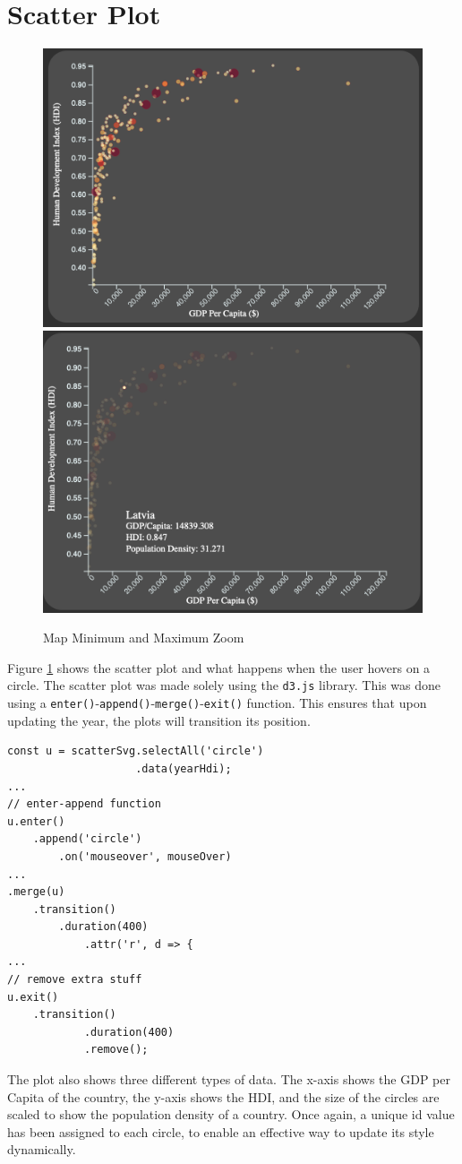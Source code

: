 \documentclass{scrreprt}
\begin{document}
\section{Scatter Plot}
\begin{figure}[H]
    \centering
    \includegraphics[height = 0.35\textwidth]{images/scatter_1.png}
    \includegraphics[height = 0.35\textwidth]{images/scatter_2.png}
    \label{fig:scatter}
    \caption{Map Minimum and Maximum Zoom}
\end{figure}
Figure \ref{fig:scatter} shows the scatter plot and what happens when the user hovers on a circle. The scatter plot was made solely using the \verb|d3.js| library. This was done using a \verb|enter()|-\verb|append()|-\verb|merge()|-\verb|exit()| function. This ensures that upon updating the year, the plots will transition its position. 
\begin{lstlisting}[label = {lst:scatter}, caption = {Scatter Plot Update}]
const u = scatterSvg.selectAll('circle')
                    .data(yearHdi);
...
// enter-append function
u.enter()
    .append('circle')
        .on('mouseover', mouseOver)
...
.merge(u)
    .transition()
        .duration(400)
            .attr('r', d => {
...
// remove extra stuff
u.exit()
    .transition()
            .duration(400)
            .remove();
\end{lstlisting}
The plot also shows three different types of data. The x-axis shows the GDP per Capita of the country, the y-axis shows the HDI, and the size of the circles are scaled to show the population density of a country. Once again, a unique id value has been assigned to each circle, to enable an effective way to update its style dynamically. 
\end{document}
